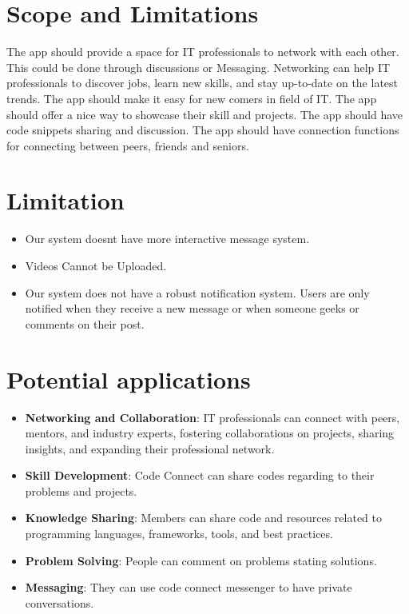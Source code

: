 \section{Scope and Limitations}
The app should provide a space for IT professionals to network with each other. This could be done through discussions or Messaging. Networking can help IT professionals to discover jobs, learn new skills, and stay up-to-date on the latest trends.
The app should make it easy for new comers in field of IT.
The app should offer a nice way to showcase their skill and projects.
The app should have code snippets sharing and discussion.
The app should have connection functions for connecting between peers, friends and seniors.
\section{Limitation}
\begin{itemize}
    \item Our system doesnt have more interactive message system.
    \item Videos Cannot be Uploaded.
    \item Our system does not have a robust notification system. Users are only notified when they receive a new message or when someone geeks or comments on their post.
\end{itemize}

\section{Potential applications}
\begin{itemize}
    \item \textbf{Networking and Collaboration}: IT professionals can connect with peers, mentors, and industry experts, fostering collaborations on projects, sharing insights, and expanding their professional network.
    \item \textbf{Skill Development}: Code Connect can share codes regarding to their problems and projects.
    \item \textbf{Knowledge Sharing}: Members can share code and resources related to programming languages, frameworks, tools, and best practices.
    \item \textbf{Problem Solving}: People can comment on problems stating solutions.  
    \item \textbf{Messaging}: They can use code connect messenger to have private conversations.
  \end{itemize}
